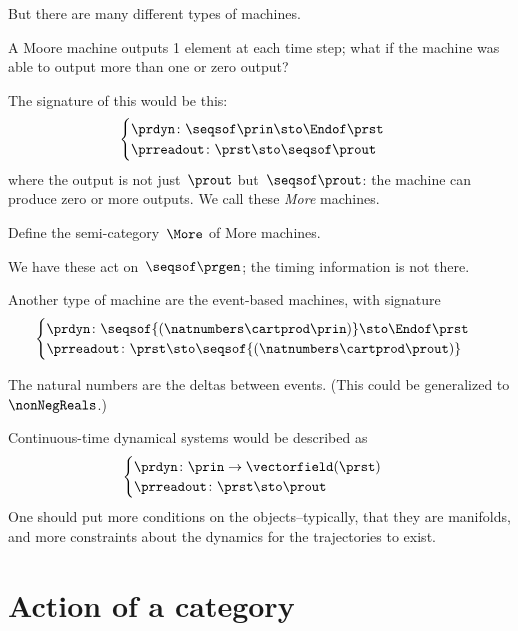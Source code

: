 But there are many different types of machines.

A Moore machine outputs 1 element at each time step; what if the machine was able to output more than one or zero output?

The signature of this would be this:
\begin{equation}\label{eq:more-signature}
  \begin{cases}
  \prdyn \colon \seqsof\prin \sto \Endof \prst \\
  \prreadout \colon \prst \sto \seqsof \prout
  \end{cases}
\end{equation}
where the output is not just~$\prout$ but~$\seqsof \prout$: the machine can produce zero or more outputs. We call these \emph{More} machines.

\begin{exercise}
Define the semi-category~$\More$ of More machines.
\end{exercise}

We have these act on~$\seqsof \prgen$; the timing information is not there.

Another type of machine are the event-based machines, with signature
\begin{equation} \label{eq:event-based}
  \begin{cases}
    \prdyn \colon \seqsof{(\natnumbers \cartprod \prin)} \sto \Endof \prst \\
    \prreadout \colon \prst \sto \seqsof{ (\natnumbers \cartprod \prout)}
    \end{cases}
\end{equation}

The natural numbers are the deltas between events. (This could be generalized to $\nonNegReals$.)

Continuous-time dynamical systems would be described as
%
\begin{equation} \label{eq:continuous}
\begin{cases}
  \prdyn\colon \prin \to \vectorfield(\prst) \\
\prreadout\colon \prst \sto   \prout
\end{cases}
\end{equation}
%
One should put more conditions on the objects--typically, that they are manifolds, and more constraints about the dynamics for the trajectories to exist.


\section{Action of a category}


